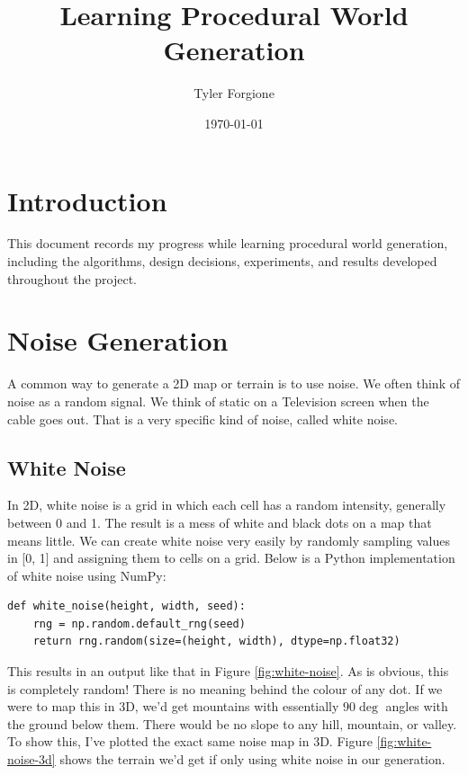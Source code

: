\documentclass[11pt]{article}
\title{Learning Procedural World Generation}
\author{Tyler Forgione}
\date{\today}
\begin{document}
\maketitle
\tableofcontents

\section{Introduction}

This document records my progress while learning procedural world generation, including the algorithms, design decisions, experiments, and results developed throughout the project.

\section{Noise Generation}

A common way to generate a 2D map or terrain is to use noise. We often think of noise as a random signal. We think of static on a Television screen when the cable goes out. That is a very specific kind of noise, called white noise.

\subsection{White Noise}

In 2D, white noise is a grid in which each cell has a random intensity, generally between 0 and 1. The result is a mess of white and black dots on a map that means little. We can create white noise very easily by randomly sampling values in [0, 1] and assigning them to cells on a grid. Below is a Python implementation of white noise using NumPy:

\begin{lstlisting}[style=python]
def white_noise(height, width, seed):
    rng = np.random.default_rng(seed)
    return rng.random(size=(height, width), dtype=np.float32)
\end{lstlisting}

This results in an output like that in Figure \ref{fig:white-noise}. As is obvious, this is completely random! There is no meaning behind the colour of any dot. If we were to map this in 3D, we'd get mountains with essentially $90\deg$ angles with the ground below them. There would be no slope to any hill, mountain, or valley. To show this, I've plotted the exact same noise map in 3D. Figure \ref{fig:white-noise-3d} shows the terrain we'd get if only using white noise in our generation.
\end{document}
